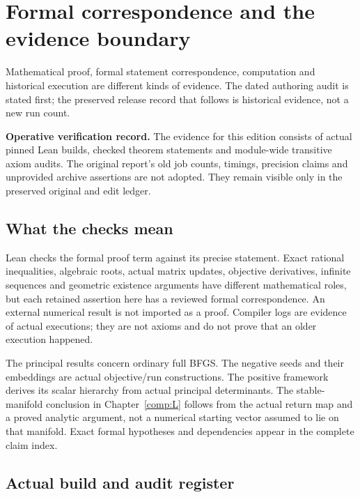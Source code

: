 \chapter{Formal correspondence and the evidence boundary}\label{comp:E}\label{E:chapter}
\renewcommand{\ModuleTag}{14}
Mathematical proof, formal statement correspondence, computation and historical execution are different kinds of evidence. The dated authoring audit is stated first; the preserved release record that follows is historical evidence, not a new run count.



\textbf{Operative verification record.} The evidence for this edition consists of actual pinned Lean builds, checked theorem statements and module-wide transitive axiom audits. The original report's old job counts, timings, precision claims and unprovided archive assertions are not adopted. They remain visible only in the preserved original and edit ledger.



\section{What the checks mean}\label{what-the-checks-mean}

Lean checks the formal proof term against its precise statement. Exact rational inequalities, algebraic roots, actual matrix updates, objective derivatives, infinite sequences and geometric existence arguments have different mathematical roles, but each retained assertion here has a reviewed formal correspondence. An external numerical result is not imported as a proof. Compiler logs are evidence of actual executions; they are not axioms and do not prove that an older execution happened.

The principal results concern ordinary full BFGS. The negative seeds and their embeddings are actual objective/run constructions. The positive framework derives its scalar hierarchy from actual principal determinants. The stable-manifold conclusion in Chapter~\ref{comp:L} follows from the actual return map and a proved analytic argument, not a numerical starting vector assumed to lie on that manifold. Exact formal hypotheses and dependencies appear in the complete claim index.



\section{Actual build and audit register}\label{fresh-execution-register}

